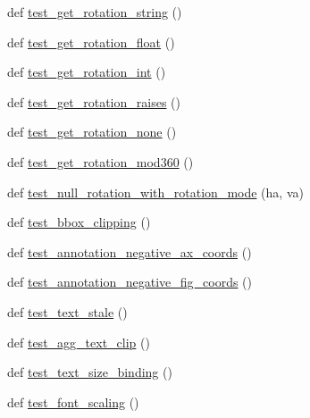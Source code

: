 \begin{DoxyCompactItemize}
\item 
def \hyperlink{namespacematplotlib_1_1tests_1_1test__text_aa26573b66897e252e7e76a1b16a0df53}{test\+\_\+get\+\_\+rotation\+\_\+string} ()
\item 
def \hyperlink{namespacematplotlib_1_1tests_1_1test__text_a3ee692897fefa0395fae856a9b8f2bc4}{test\+\_\+get\+\_\+rotation\+\_\+float} ()
\item 
def \hyperlink{namespacematplotlib_1_1tests_1_1test__text_a8457fa63ff154c6e4f9918567a1093a8}{test\+\_\+get\+\_\+rotation\+\_\+int} ()
\item 
def \hyperlink{namespacematplotlib_1_1tests_1_1test__text_a2bb757124b341f354fbf9700653bde0c}{test\+\_\+get\+\_\+rotation\+\_\+raises} ()
\item 
def \hyperlink{namespacematplotlib_1_1tests_1_1test__text_a6767a2271c26f03df6af5ec92db59c26}{test\+\_\+get\+\_\+rotation\+\_\+none} ()
\item 
def \hyperlink{namespacematplotlib_1_1tests_1_1test__text_a8b7bc96d5508dbffd38bd42ca2df7fbd}{test\+\_\+get\+\_\+rotation\+\_\+mod360} ()
\item 
def \hyperlink{namespacematplotlib_1_1tests_1_1test__text_afdb19ea2d6108c9be5cd453cb63c9e44}{test\+\_\+null\+\_\+rotation\+\_\+with\+\_\+rotation\+\_\+mode} (ha, va)
\item 
def \hyperlink{namespacematplotlib_1_1tests_1_1test__text_a9e3d27164c743d72c1754b50abdc1e61}{test\+\_\+bbox\+\_\+clipping} ()
\item 
def \hyperlink{namespacematplotlib_1_1tests_1_1test__text_a82f6e1ab7f4d40fb7dfc7ad11ee28804}{test\+\_\+annotation\+\_\+negative\+\_\+ax\+\_\+coords} ()
\item 
def \hyperlink{namespacematplotlib_1_1tests_1_1test__text_ab9fac411dee7b84ca5c5eba3d3b13a44}{test\+\_\+annotation\+\_\+negative\+\_\+fig\+\_\+coords} ()
\item 
def \hyperlink{namespacematplotlib_1_1tests_1_1test__text_a409822c4a4b1c4afa6664720019c0c41}{test\+\_\+text\+\_\+stale} ()
\item 
def \hyperlink{namespacematplotlib_1_1tests_1_1test__text_ad97c6ee87ebe1d06cde830eb0520a147}{test\+\_\+agg\+\_\+text\+\_\+clip} ()
\item 
def \hyperlink{namespacematplotlib_1_1tests_1_1test__text_ad59b2b986203cc6ca4f563a2a6cbad83}{test\+\_\+text\+\_\+size\+\_\+binding} ()
\item 
def \hyperlink{namespacematplotlib_1_1tests_1_1test__text_a853359c3ffb32626d2a632a4645369bf}{test\+\_\+font\+\_\+scaling} ()
\item 

\end{DoxyCompactItemize}
